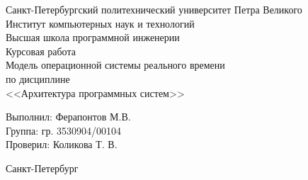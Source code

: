\begin{titlepage}	%

	\begin{center}		%

		\large Санкт-Петербургский политехнический университет Петра Великого\\
		\large Институт компьютерных наук и технологий\\
		\large Высшая школа программной инженерии \\[6cm]

    \huge Курсовая работа \\%
		\large Модель операционной системы реального времени \\ [0.5cm]
		\large по дисциплине\\[0.1cm]
		\large <<Архитектура программных систем>>

	\end{center}

		\noindent\large Выполнил: \hfill \large Ферапонтов М.В.\\
		\noindent\large Группа: \hfill \large гр. 3530904/00104\\

		\noindent\large Проверил: \hfill \large Коликова Т. В.

	\vfill %

	\begin{center}
	\large Санкт-Петербург\\
	\large \the\year %
	\end{center} %

\end{titlepage} %

\vfill %
